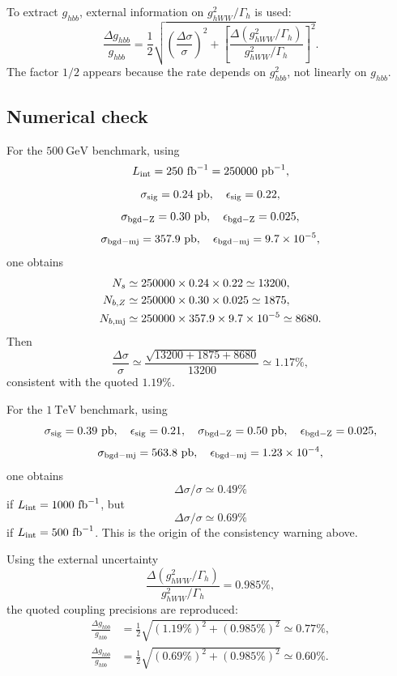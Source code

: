 \documentclass[11pt,a4paper]{article}
\newcommand{\gev}{\ensuremath{~\mathrm{GeV}}}
\newcommand{\tev}{\ensuremath{~\mathrm{TeV}}}
\newcommand{\invfb}{\ensuremath{~\mathrm{fb}^{-1}}}
\newcommand{\pb}{\ensuremath{~\mathrm{pb}}}
\newcommand{\ghbb}{\ensuremath{g_{hbb}}}
\begin{document}
To extract \(\ghbb\), external information on \(g_{hWW}^2/\Gamma_h\) is used:
\begin{equation}
  \frac{\Delta g_{hbb}}{g_{hbb}}
  =
  \frac{1}{2}
  \sqrt{
  \left(\frac{\Delta\sigma}{\sigma}\right)^2+
  \left[
  \frac{
  \Delta(g_{hWW}^2/\Gamma_h)
  }{
  g_{hWW}^2/\Gamma_h
  }
  \right]^2
  }.
  \label{eq:ghbb_precision}
\end{equation}
The factor \(1/2\) appears because the rate depends on \(g_{hbb}^2\), not linearly on
\(g_{hbb}\).





\subsection{Numerical check}


For the \(500\gev\) benchmark, using
\[
  L_{\rm int}=250\invfb=250000\pb^{-1},
\]
\[
  \sigma_{\rm sig}=0.24\pb,\quad \epsilon_{\rm sig}=0.22,
\]
\[
  \sigma_{\rm bgd-Z}=0.30\pb,\quad \epsilon_{\rm bgd-Z}=0.025,
\]
\[
  \sigma_{\rm bgd-mj}=357.9\pb,\quad \epsilon_{\rm bgd-mj}=9.7\times10^{-5},
\]
one obtains
\begin{align}
  N_s &\simeq 250000\times0.24\times0.22\simeq13200,\\
  N_{b,Z} &\simeq 250000\times0.30\times0.025\simeq1875,\\
  N_{b,{\rm mj}} &\simeq 250000\times357.9\times9.7\times10^{-5}\simeq8680.
\end{align}
Then
\begin{equation}
  \frac{\Delta\sigma}{\sigma}
  \simeq
  \frac{\sqrt{13200+1875+8680}}{13200}
  \simeq1.17\%,
\end{equation}
consistent with the quoted \(1.19\%\).

For the \(1\tev\) benchmark, using
\[
  \sigma_{\rm sig}=0.39\pb,\quad \epsilon_{\rm sig}=0.21,\quad
  \sigma_{\rm bgd-Z}=0.50\pb,\quad \epsilon_{\rm bgd-Z}=0.025,
\]
\[
  \sigma_{\rm bgd-mj}=563.8\pb,\quad \epsilon_{\rm bgd-mj}=1.23\times10^{-4},
\]
one obtains
\[
  \Delta\sigma/\sigma\simeq0.49\%
\]
if \(L_{\rm int}=1000\invfb\), but
\[
  \Delta\sigma/\sigma\simeq0.69\%
\]
if \(L_{\rm int}=500\invfb\).  This is the origin of the consistency warning above.

Using the external uncertainty
\[
  \frac{\Delta(g_{hWW}^2/\Gamma_h)}{g_{hWW}^2/\Gamma_h}=0.985\%,
\]
the quoted coupling precisions are reproduced:
\begin{align}
  \frac{\Delta g_{hbb}}{g_{hbb}}
  &=
  \frac12\sqrt{(1.19\%)^2+(0.985\%)^2}
  \simeq0.77\%,\\
  \frac{\Delta g_{hbb}}{g_{hbb}}
  &=
  \frac12\sqrt{(0.69\%)^2+(0.985\%)^2}
  \simeq0.60\%.
\end{align}
\end{document}

